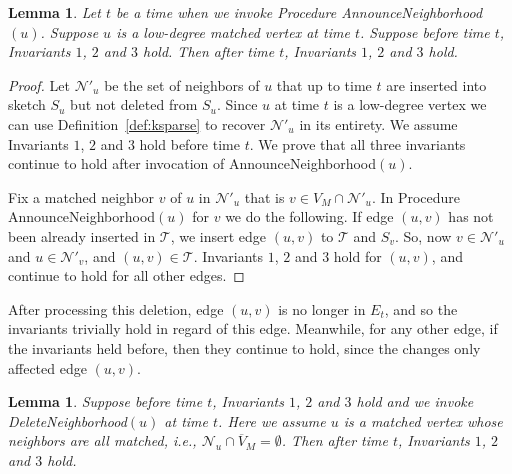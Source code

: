\documentclass[11pt,letter]{article}
\newtheorem{lemma}[theorem]{Lemma}
\begin{document}
\begin{lemma}
\label{lem:timestamps:case:4}
Let $t$ be a time when we invoke Procedure {\sf AnnounceNeighborhood$(u)$}.
Suppose $u$ is a low-degree matched vertex at time $t$.
Suppose before time $t$, Invariants $1$, $2$ and $3$ hold.
Then after time $t$, Invariants $1$, $2$ and $3$ hold.
\end{lemma}

\begin{proof}
Let $\mathcal{N}'_u$ be the set of neighbors of $u$ that up to time $t$
are inserted into sketch $S_u$ but not deleted from $S_u$.
Since $u$ at time $t$ is a low-degree vertex we can use
Definition~\ref{def:ksparse} to recover $\mathcal{N}'_u$ in its entirety.
We assume Invariants $1$, $2$ and $3$ hold before time $t$.
We prove that all three invariants continue to hold after invocation of
{\sf AnnounceNeighborhood$(u)$}.

Fix a matched neighbor $v$ of $u$ in $\mathcal{N}'_u$ that is
$v\in V_M\cap\mathcal{N}'_u$. In Procedure
{\sf AnnounceNeighborhood$(u)$} for $v$ we do the following.
If edge $(u,v)$ has not been already inserted in $\mathcal{T}$,
we insert edge $(u,v)$ to $\mathcal{T}$ and $S_v$.
So, now $v\in \mathcal{N}'_u$ and $u\in \mathcal{N}'_v$, and
$(u,v) \in \mathcal{T}$. Invariants $1$, $2$ and $3$ hold for $(u,v)$,
and continue to hold for all other edges.
\end{proof}

After processing this deletion, edge $(u,v)$ is no longer in $E_t$,
and so the invariants trivially hold in regard of this edge.
Meanwhile, for any other edge, if the invariants held before, then
they continue to hold, since the changes only affected edge $(u,v)$.



\begin{lemma}
\label{lem:timestamps:case:5}
Suppose before time $t$, Invariants $1$, $2$ and $3$ hold and we
invoke {\sf DeleteNeighborhood$(u)$} at time $t$.
Here we assume $u$ is a matched vertex whose neighbors are all matched, i.e.,
$\mathcal{N}_u\cap \overline{V}_M=\emptyset$.
Then after time $t$, Invariants $1$, $2$ and $3$ hold.
\end{lemma}
\end{document}
